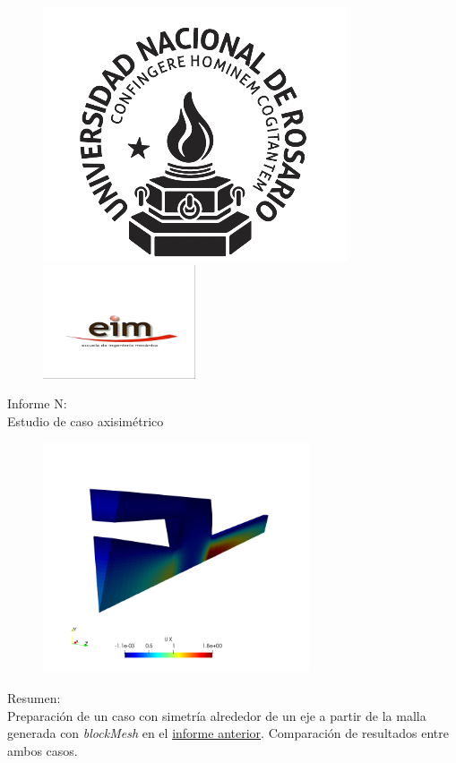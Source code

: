 \documentclass{article}
\begin{document}
\begin{titlepage}
  \begin{figure}[t]
    \centering
    \includegraphics[]{../Figuras_Globales/00_unr.png}
    \hspace{0.15\textwidth}
    \includegraphics[width=0.4\textwidth]{../Figuras_Globales/00_eim.png}
\end{figure}
  
\begin{center}
    {\Huge Informe N:\\ Estudio de caso axisimétrico \par}
    
    
    \begin{figure}[h]
        \centering
        \includegraphics[width=0.7\textwidth]{Figuras/00_intro2.png}
    \end{figure}
    {\Huge Resumen:\\}
   Preparación de un caso con simetría alrededor de un eje a partir de la malla generada con \textit{blockMesh} en el  \href{https://github.com/guillerolle/informes_cfd/blob/master/Informe01.pdf}{informe anterior}. Comparación de resultados entre ambos casos.
    

\end{center}
\end{titlepage}
\end{document}
